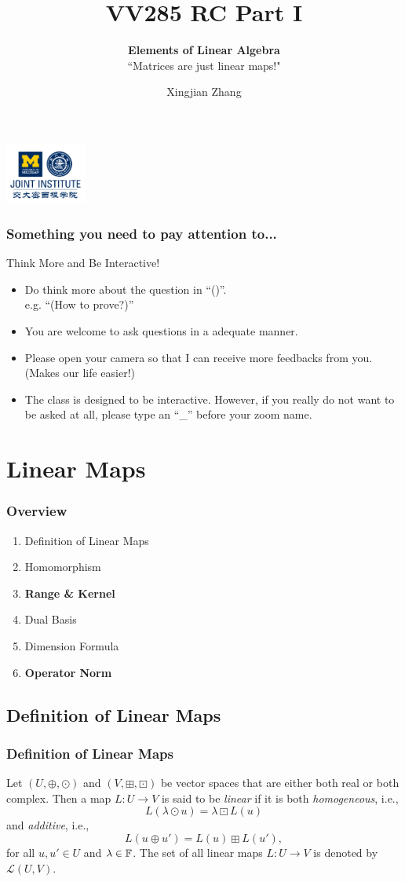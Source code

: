 \documentclass[12pt, t]{beamer}
\title{VV285 RC Part I}
\subtitle{\textbf{Elements of Linear Algebra}\\``Matrices are just linear maps!"}
\institute[UM-SJTU JI]{Univerity of Michigan-Shanghai Jiao Tong University Joint Institute}
\author{Xingjian Zhang}
\renewcommand{\emph}[1]{{\color{Turquoise3}\textsl{#1}}}
\begin{document}
\begin{frame}
    \titlepage
    \begin{center}
        \includegraphics[height=2cm]{logo2.png}
    \end{center}
\end{frame}

\begin{frame}
    \frametitle{Something you need to pay attention to...}
    Think More and Be Interactive!
    \begin{itemize}
        \item Do think more about the question in ``()''. \\e.g. ``(How to prove?)''
        \item You are welcome to ask questions in a adequate manner.
        \item Please open your camera so that I can receive more feedbacks from you. (Makes our life easier!)
        \item The class is designed to be interactive. However, if you really do not want to be asked at all, please type an ``\_'' before your zoom name.
    \end{itemize}
\end{frame}

\section{Linear Maps}
\begin{frame}
    \frametitle{Overview}
    \begin{enumerate}
        \item Definition of Linear Maps
        \item Homomorphism
        \item \textbf{Range \& Kernel}
        \item Dual Basis
        \item Dimension Formula
        \item \textbf{Operator Norm}
    \end{enumerate}
\end{frame}

\subsection{Definition of Linear Maps}
\begin{frame}
    \frametitle{Definition of Linear Maps}
    Let $(U,\oplus,\odot)$ and $(V,\boxplus,\boxdot)$ be vector spaces that are either both real or both complex. Then a map $L:U\rightarrow V$ is said to be \emph{linear} if it is both \emph{homogeneous}, i.e.,
    \[L(\lambda\odot u)=\lambda\boxdot L(u)\]
    and \emph{additive}, i.e.,
    \[L(u\oplus u')=L(u)\boxplus L(u'),\]
    for all $u,u'\in U$ and $\lambda\in\mathbb{F}$. The set of all linear maps $L:U\rightarrow V$ is denoted by $\mathcal{L}(U,V).$
\end{frame}
\end{document}
